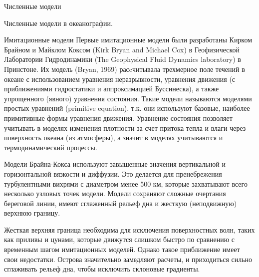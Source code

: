 \begin{chapter}{Численные модели}
\begin{section}{Численные модели в океанографии.}
\begin{paragraph}{Имитационные модели}
Первые имитационные модели были разработаны Кирком Брайном и Майклом
Коксом (Kirk Bryan and Michael Cox) в Геофизической Лаборатории
Гидродинамики (Тhe Geophysical Fluid Dynamics laboratory) в
Принстоне. Их модель (Bryan, 1969) расcчитывала трехмерное поле
течений в океане с использованием уравнения неразрывности, уравнения
движения (с приближениями гидростатики и аппроксимацией Буссинеска), а
также упрощенного (явного) уравнения состояния. Такие модели
называются моделями простых уравнений (primitive equation), т.к. они
используют базовые, наиболее примитивные формы уравнения
движения. Уравнение состояния позволяет учитывать в моделях изменения
плотности за счет притока тепла и влаги через поверхность океана (из
атмосферы), а значит в моделях учитываются и термодинамический
процессы.
%

Модели Брайна-Кокса используют завышенные значения вертикальной и
горизонтальной вязкости и диффузии. Это делается для пренебрежения
турбулентными вихрями с диаметром менее 500 км, которые захватывают
всего несколько узловых точек модели. Модели сохраняют сложные
очертания береговой линии, имеют сглаженный рельеф дна и жесткую
(неподвижную) верхнюю границу.

Жесткая верхняя граница необходима для исключения поверхностных волн,
таких как приливы и цунами, которые движутся слишком быстро по
сравнению с временным шагом имитационных моделей. Однако такое
приближение имеет свои недостатки. Острова значительно замедляют
расчеты, и приходиться сильно сглаживать рельеф дна, чтобы исключить
склоновые градиенты.
%


\end{paragraph}
\end{section}
\end{chapter}
